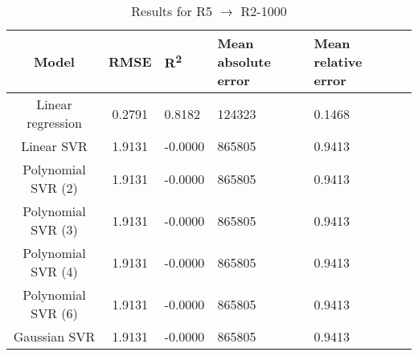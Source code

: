 \begin{table}[H]
\centering
\begin{adjustbox}{center}
\begin{tabular}{c | c M{1.2cm} M{2.5cm} M{2.5cm} M{1.8cm}}
Model & RMSE & R\textsuperscript{2} & Mean absolute error & Mean relative error \tabularnewline
\hline
Linear regression & 0.2791 & 0.8182 & 124323 & 0.1468 \\
Linear SVR & 1.9131 & -0.0000 & 865805 & 0.9413 \\
Polynomial SVR (2) & 1.9131 & -0.0000 & 865805 & 0.9413 \\
Polynomial SVR (3) & 1.9131 & -0.0000 & 865805 & 0.9413 \\
Polynomial SVR (4) & 1.9131 & -0.0000 & 865805 & 0.9413 \\
Polynomial SVR (6) & 1.9131 & -0.0000 & 865805 & 0.9413 \\
Gaussian SVR & 1.9131 & -0.0000 & 865805 & 0.9413 \\
\end{tabular}
\end{adjustbox}
\\
\caption{Results for R5 $\rightarrow$ R2-1000}
\label{tab:coreonly_linear_R5_R2_1000}
\end{table}
